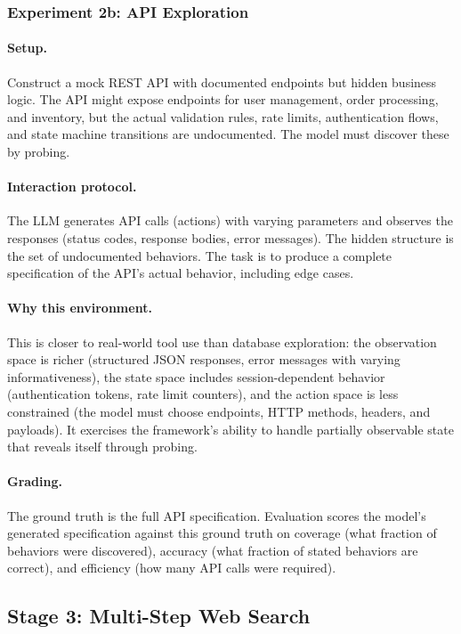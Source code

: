 \documentclass[11pt]{article}
\begin{document}
\subsubsection{Experiment 2b: API Exploration}
\label{sec:exp-api}

\paragraph{Setup.}
Construct a mock REST API with documented endpoints but hidden business logic. The API might expose endpoints for user management, order processing, and inventory, but the actual validation rules, rate limits, authentication flows, and state machine transitions are undocumented. The model must discover these by probing.

\paragraph{Interaction protocol.}
The LLM generates API calls (actions) with varying parameters and observes the responses (status codes, response bodies, error messages). The hidden structure is the set of undocumented behaviors. The task is to produce a complete specification of the API's actual behavior, including edge cases.

\paragraph{Why this environment.}
This is closer to real-world tool use than database exploration: the observation space is richer (structured JSON responses, error messages with varying informativeness), the state space includes session-dependent behavior (authentication tokens, rate limit counters), and the action space is less constrained (the model must choose endpoints, HTTP methods, headers, and payloads). It exercises the framework's ability to handle partially observable state that reveals itself through probing.

\paragraph{Grading.}
The ground truth is the full API specification. Evaluation scores the model's generated specification against this ground truth on coverage (what fraction of behaviors were discovered), accuracy (what fraction of stated behaviors are correct), and efficiency (how many API calls were required).


\subsection{Stage 3: Multi-Step Web Search}
\label{sec:exp-stage3}
\end{document}
